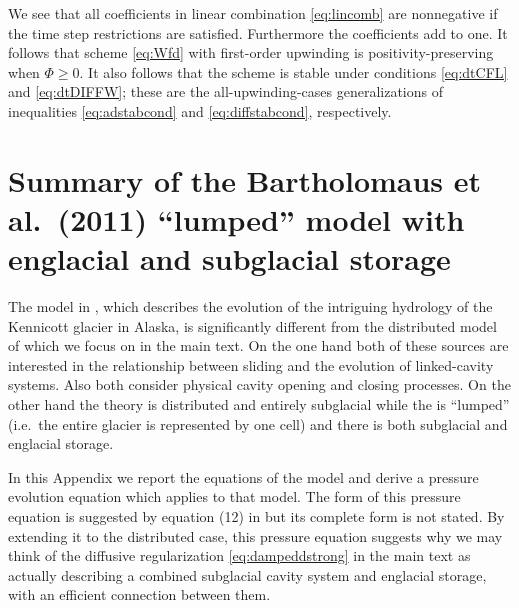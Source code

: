 \documentclass[11pt,final]{amsart}%
\begin{document}
We see that all coefficients in linear combination \eqref{eq:lincomb} are nonnegative if the time step restrictions are satisfied.  Furthermore the coefficients add to one.  It follows \citep{MortonMayers} that scheme \eqref{eq:Wfd} with first-order upwinding is positivity-preserving when $\Phi\ge 0$.  It also follows that the scheme is stable under conditions \eqref{eq:dtCFL} and \eqref{eq:dtDIFFW}; these are the all-upwinding-cases generalizations of inequalities \eqref{eq:adstabcond} and \eqref{eq:diffstabcond}, respectively.


\section{Summary of the Bartholomaus et al.~(2011) ``lumped'' model with englacial and subglacial storage}  The model in \cite{Bartholomausetal2011}, which describes the evolution of the intriguing hydrology of the Kennicott glacier in Alaska, is significantly different from the distributed model of \cite{Schoofetal2012} which we focus on in the main text.  On the one hand both of these sources are interested in the relationship between sliding and the evolution of linked-cavity systems.  Also both consider physical cavity opening and closing processes.  On the other hand the \cite{Schoofetal2012} theory is distributed and entirely subglacial while the \cite{Bartholomausetal2011} is ``lumped'' (i.e.~the entire glacier is represented by one cell) and there is both subglacial and englacial storage.

In this Appendix we report the equations of the \cite{Bartholomausetal2011} model and derive a pressure evolution equation which applies to that model.  The form of this pressure equation is suggested by equation (12) in \cite{Bartholomausetal2011} but its complete form is not stated.  By extending it to the distributed case, this pressure equation suggests why we may think of the diffusive regularization \eqref{eq:dampeddstrong} in the main text as actually describing a combined subglacial cavity system and englacial storage, with an efficient connection between them.
\end{document}
